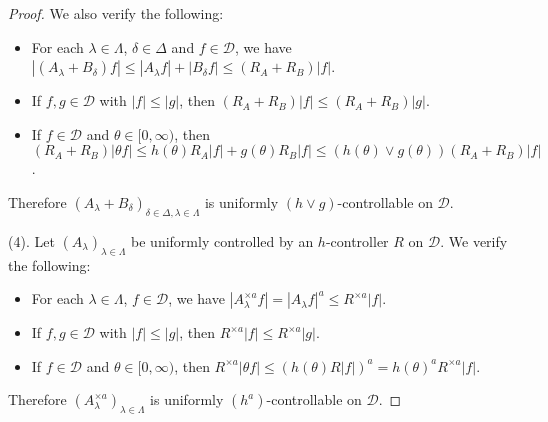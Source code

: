 \documentclass[12pt,a4paper]{amsart}
\theoremstyle{plain}
\theoremstyle{definition}
\numberwithin{equation}{section}
\begin{document}
\begin{proof}
    We also verify the following:
\begin{itemize}
\item
    For each $\lambda \in \Lambda$, $\delta \in \Delta$ and $f\in \mathcal D$, we have $|(A_\lambda + B_\delta) f| \leq |A_\lambda f| + |B_\delta f| \leq (R_A + R_B) |f|$.
\item
    If $f,g \in \mathcal D$ with $|f|\leq |g|$, then $(R_A + R_B)|f| \leq (R_A + R_B) |g|$.
\item
    If $f \in \mathcal D$ and $\theta \in [0,\infty)$, then $(R_A + R_B) |\theta f| \leq h(\theta) R_A|f| + g(\theta) R_B|f| \leq (h(\theta) \vee g(\theta)) (R_A+R_B)|f| $.
\end{itemize}
    Therefore $(A_\lambda + B_\delta)_{\delta\in \Delta, \lambda \in \Lambda}$ is uniformly $(h \vee g)$-controllable on $\mathcal D$.

    (4). Let $(A_\lambda)_{\lambda\in\Lambda}$ be uniformly controlled by an $h$-controller $R$ on $\mathcal D$.
    We verify the following:  
\begin{itemize}
\item
    For each $\lambda \in \Lambda$, $f\in \mathcal D$, we have $|A_\lambda^{\times a} f| = |A_\lambda f|^a  \leq R^{\times a} |f|$.
\item
    If $f,g \in \mathcal D$ with $|f|\leq |g|$, then $R^{\times a}|f| \leq R^{\times a} |g|$.
\item
    If $f \in \mathcal D$ and $\theta \in [0,\infty)$, then $R^{\times a}|\theta f| \leq (h(\theta) R |f|)^a = h(\theta)^a R^{\times a}|f|$.
\end{itemize}
    Therefore $(A_\lambda^{\times a})_{\lambda \in \Lambda}$ is uniformly $(h^a)$-controllable on $\mathcal D$.
\end{proof}
\end{document}
